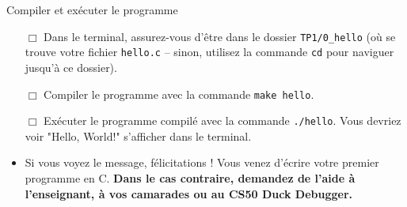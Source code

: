 \begin{UPSTIManipulation}{Compiler et exécuter le programme}
	\begin{itemize}
		\item[$\Box$] Dans le terminal, assurez-vous d'être dans le dossier \texttt{TP1/0\_hello} (où se trouve votre fichier \texttt{hello.c} -- sinon, utilisez la commande \texttt{cd} pour naviguer jusqu'à ce dossier).
		\item[$\Box$] Compiler le programme avec la commande \texttt{make hello}.
		\item[$\Box$] Exécuter le programme compilé avec la commande \texttt{./hello}. Vous devriez voir "Hello, World!" s'afficher dans le terminal.
	\end{itemize}
	
	\begin{itemize}
		\item Si vous voyez le message, félicitations ! Vous venez d'écrire   votre premier programme en C. \textbf{Dans le cas contraire, demandez de l'aide à l'enseignant, à vos camarades ou au CS50 Duck Debugger.}
	\end{itemize}
\end{UPSTIManipulation}
